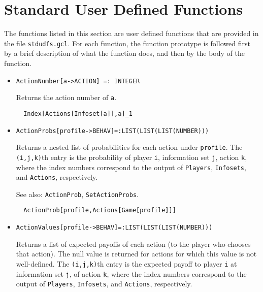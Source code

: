\section{Standard User Defined Functions}
\renewcommand{\mysectionname}{\thesection\,\, USER DEFINED FUNCTIONS}

The functions listed in this section are user defined functions that
are provided in the file \verb+stdudfs.gcl+.  For each function, the
function prototype is followed first by a brief description of what
the function does, and then by the body of the function.  

\begin{itemize}


\item{}
\protect \large \begin{verbatim}
ActionNumber[a->ACTION] =: INTEGER 
\end{verbatim}\normalsize

\bd 
Returns the action number of \verb+a+.
\begin{verbatim}
  Index[Actions[Infoset[a]],a]_1
\end{verbatim} 
\ed

\item{}
\protect \large \begin{verbatim}
ActionProbs[profile->BEHAV]=:LIST(LIST(LIST(NUMBER)))
\end{verbatim}\normalsize

\bd 
Returns a nested list of probabilities for each action under
\verb+profile+.  The \verb+(i,j,k)+th entry is the probability of
player \verb+i+, information set \verb+j+, action \verb+k+, where the
index numbers correspond to the output of \verb+Players+, \verb+Infosets+,
and \verb+Actions+, respectively. 

\item [See also:] \verb+ActionProb+, \verb+SetActionProbs+.

\begin{verbatim}
  ActionProb[profile,Actions[Game[profile]]]
\end{verbatim} 
\ed

\item{}
\protect \large \begin{verbatim}
ActionValues[profile->BEHAV]=:LIST(LIST(LIST(NUMBER)))
\end{verbatim}\normalsize

\bd
Returns a list of expected payoffs of each action (to the player
who chooses that action).  The null value is returned for actions for
which this value is not well-defined.  The \verb+(i,j,k)+th entry is
the expected payoff to player \verb+i+ at information set \verb+j+, of
action \verb+k+, where the index numbers correspond to the output of
\verb+Players+, \verb+Infosets+, and \verb+Actions+, respectively.


\end{itemize}
